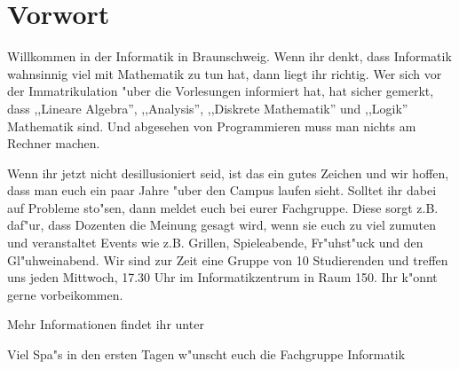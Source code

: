 \section*{Vorwort}

\renewcommand{\baselinestretch}{0.75}\normalsize
Willkommen in der Informatik in Braunschweig.
Wenn ihr denkt, dass Informatik wahnsinnig viel mit Mathematik zu tun hat, dann liegt ihr richtig.
Wer sich vor der Immatrikulation "uber die Vorlesungen informiert hat, hat sicher gemerkt, dass ,,Lineare Algebra'', ,,Analysis'', ,,Diskrete Mathematik'' und ,,Logik'' Mathematik sind. Und abgesehen von Programmieren muss man nichts am Rechner machen.
 
Wenn ihr jetzt nicht desillusioniert seid, ist das ein gutes Zeichen und wir
hoffen, dass man euch ein paar Jahre "uber den Campus laufen sieht. Solltet ihr dabei auf Probleme sto"sen, dann meldet euch bei eurer Fachgruppe. Diese sorgt z.B. daf"ur, dass Dozenten die Meinung gesagt wird, wenn sie euch zu viel zumuten und veranstaltet Events wie z.B. Grillen, Spieleabende, Fr"uhst"uck und den Gl"uhweinabend. Wir sind zur Zeit eine Gruppe von 10 Studierenden und treffen uns jeden Mittwoch, 17.30 Uhr im Informatikzentrum in Raum 150. Ihr k"onnt gerne vorbeikommen. 

Mehr Informationen findet ihr unter \mbox{}

Viel Spa"s in den ersten Tagen w"unscht euch die Fachgruppe Informatik

\renewcommand{\baselinestretch}{1}\normalsize